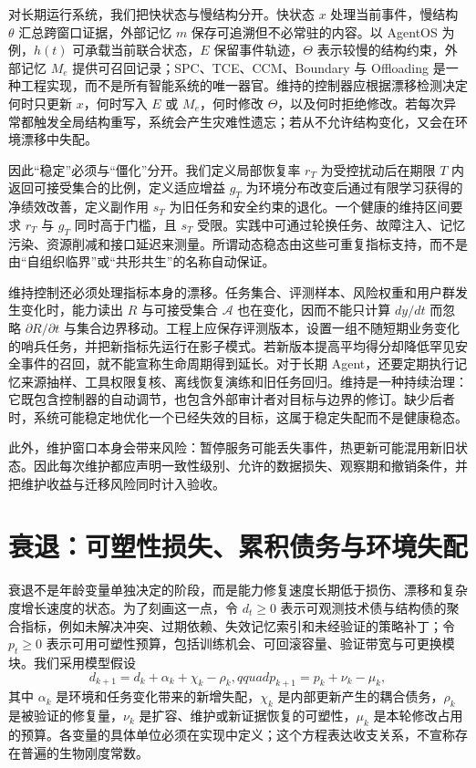 对长期运行系统，我们把快状态与慢结构分开。快状态 $x$ 处理当前事件，慢结构 $\theta$ 汇总跨窗口证据，外部记忆 $m$ 保存可追溯但不必常驻的内容。以 AgentOS 为例，$h(t)$ 可承载当前联合状态，$E$ 保留事件轨迹，$\Theta$ 表示较慢的结构约束，外部记忆 $M_e$ 提供可召回记录；SPC、TCE、CCM、Boundary 与 Offloading 是一种工程实现，而不是所有智能系统的唯一器官。维持的控制器应根据漂移检测决定何时只更新 $x$，何时写入 $E$ 或 $M_e$，何时修改 $\Theta$，以及何时拒绝修改。若每次异常都触发全局结构重写，系统会产生灾难性遗忘；若从不允许结构变化，又会在环境漂移中失配。

因此“稳定”必须与“僵化”分开。我们定义局部恢复率 $r_T$ 为受控扰动后在期限 $T$ 内返回可接受集合的比例，定义适应增益 $g_T$ 为环境分布改变后通过有限学习获得的净绩效改善，定义副作用 $s_T$ 为旧任务和安全约束的退化。一个健康的维持区间要求 $r_T$ 与 $g_T$ 同时高于门槛，且 $s_T$ 受限。实践中可通过轮换任务、故障注入、记忆污染、资源削减和接口延迟来测量。所谓动态稳态由这些可重复指标支持，而不是由“自组织临界”或“共形共生”的名称自动保证。

维持控制还必须处理指标本身的漂移。任务集合、评测样本、风险权重和用户群发生变化时，能力读出 $R$ 与可接受集合 $\mathcal A$ 也在变化，因而不能只计算 $dy/dt$ 而忽略 $\partial R/\partial t$ 与集合边界移动。工程上应保存评测版本，设置一组不随短期业务变化的哨兵任务，并把新指标先运行在影子模式。若新版本提高平均得分却降低罕见安全事件的召回，就不能宣称生命周期得到延长。对于长期 Agent，还要定期执行记忆来源抽样、工具权限复核、离线恢复演练和旧任务回归。维持是一种持续治理：它既包含控制器的自动调节，也包含外部审计者对目标与边界的修订。缺少后者时，系统可能稳定地优化一个已经失效的目标，这属于稳定失配而不是健康稳态。

此外，维护窗口本身会带来风险：暂停服务可能丢失事件，热更新可能混用新旧状态。因此每次维护都应声明一致性级别、允许的数据损失、观察期和撤销条件，并把维护收益与迁移风险同时计入验收。

\section{衰退：可塑性损失、累积债务与环境失配}
\label{sec:destruction}

衰退不是年龄变量单独决定的阶段，而是能力修复速度长期低于损伤、漂移和复杂度增长速度的状态。为了刻画这一点，令 $d_t\ge0$ 表示可观测技术债与结构债的聚合指标，例如未解决冲突、过期依赖、失效记忆索引和未经验证的策略补丁；令 $p_t\ge0$ 表示可用可塑性预算，包括训练机会、可回滚容量、验证带宽与可更换模块。我们采用模型假设
\begin{equation}
    d_{k+1}=d_k+\alpha_k+\chi_k-\rho_k,qquad
    p_{k+1}=p_k+\nu_k-\mu_k,
\end{equation}
其中 $\alpha_k$ 是环境和任务变化带来的新增失配，$\chi_k$ 是内部更新产生的耦合债务，$\rho_k$ 是被验证的修复量，$\nu_k$ 是扩容、维护或新证据恢复的可塑性，$\mu_k$ 是本轮修改占用的预算。各变量的具体单位必须在实现中定义；这个方程表达收支关系，不宣称存在普遍的生物刚度常数。

